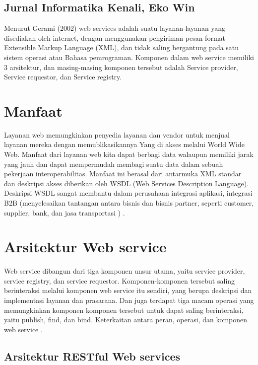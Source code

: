 \documentclass[12pt]{article}
\begin{document}
\subsection{Jurnal Informatika Kenali, Eko Win }

Menurut Gerami (2002) web services adalah suatu layanan-layanan yang disediakan oleh internet, dengan menggunakan pengiriman pesan format Extensible Markup Language (XML), dan tidak saling bergantung pada satu sistem operasi atau Bahasa pemrograman. Komponen dalam web service memiliki 3 arsitektur, dan masing-masing komponen tersebut adalah Service provider, Service requestor, dan Service registry\cite{kenali2015desain}. 

\section{Manfaat}

Layanan web memungkinkan penyedia layanan dan vendor untuk menjual layanan mereka dengan memublikasikannya
Yang di akses melalui World Wide Web.
Manfaat dari layanan web kita dapat berbagi data walaupun memiliki jarak yang jauh dan dapat mempermudah membagi suatu data dalam sebuah pekerjaan
interoperabilitas. Manfaat ini berasal dari antarmuka XML standar dan deskripsi akses
diberikan oleh WSDL (Web Services Description Language). Deskripsi WSDL sangat membantu dalam perusahaan
integrasi aplikasi, integrasi B2B (menyelesaikan tantangan antara bisnis dan bisnis partner, seperti customer, supplier, bank, dan jasa transportasi ) \cite{ferris2003web}.

\section{Arsitektur Web service}
\paragraph{}
Web service dibangun dari tiga komponen unsur utama, yaitu service provider, service registry, dan service requestor. Komponen-komponen tersebut saling berinteraksi melalui komponen web service itu sendiri, yang berupa deskripsi dan implementasi layanan dan prasarana. Dan juga terdapat tiga macam operasi yang memungkinkan komponen komponen tersebut untuk dapat saling berinteraksi, yaitu publish, find, dan bind. Keterkaitan antara peran, operasi, dan komponen web service \cite{saputra2integrasi}.

\subsection{Arsitektur RESTful Web services}
\end{document}
